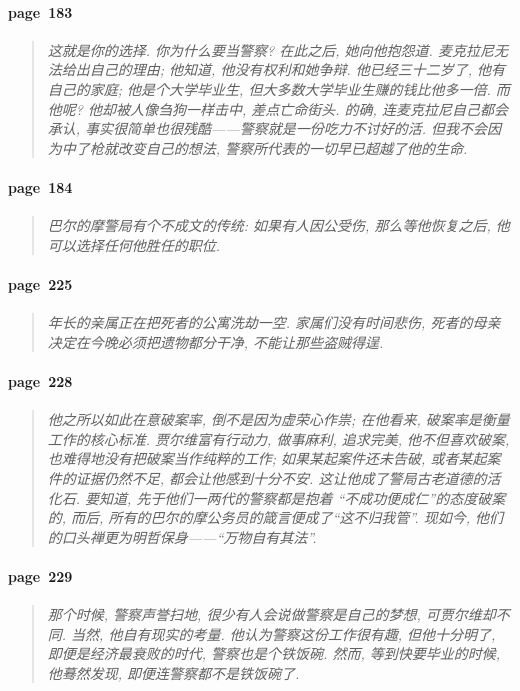\paragraph*{page~183}
\begin{quotation}
    \itshape
    这就是你的选择. 你为什么要当警察? 在此之后, 她向他抱怨道. 麦克拉尼无法给出自己的理由; 他知道, 他没有权利和她争辩. 他已经三十二岁了, 他有自己的家庭; 他是个大学毕业生, 但大多数大学毕业生赚的钱比他多一倍. 而他呢? 他却被人像刍狗一样击中, 差点亡命街头. 的确, 连麦克拉尼自己都会承认, 事实很简单也很残酷------警察就是一份吃力不讨好的活. 但我不会因为中了枪就改变自己的想法, 警察所代表的一切早已超越了他的生命.  
\end{quotation}

\paragraph*{page~184}
\begin{quotation}
    \itshape
    巴尔的摩警局有个不成文的传统: 如果有人因公受伤, 那么等他恢复之后, 他可以选择任何他胜任的职位. 
\end{quotation}

\paragraph*{page~225}
\begin{quotation}
    \itshape
    年长的亲属正在把死者的公寓洗劫一空. 家属们没有时间悲伤, 死者的母亲决定在今晚必须把遗物都分干净, 不能让那些盗贼得逞. 
\end{quotation}

\paragraph*{page~228}
\begin{quotation}
    \itshape
    他之所以如此在意破案率, 倒不是因为虚荣心作祟; 在他看来, 破案率是衡量工作的核心标准. 贾尔维富有行动力, 做事麻利, 追求完美, 他不但喜欢破案, 也难得地没有把破案当作纯粹的工作; 如果某起案件还未告破, 或者某起案件的证据仍然不足, 都会让他感到十分不安. 这让他成了警局古老道德的活化石. 要知道, 先于他们一两代的警察都是抱着 ``不成功便成仁''的态度破案的, 而后, 所有的巴尔的摩公务员的箴言便成了``这不归我管''. 现如今, 他们的口头禅更为明哲保身------``万物自有其法''.
\end{quotation}

\paragraph*{page~229}
\begin{quotation}
    \itshape
    那个时候, 警察声誉扫地, 很少有人会说做警察是自己的梦想, 可贾尔维却不同. 当然, 他自有现实的考量. 他认为警察这份工作很有趣, 但他十分明了, 即便是经济最衰败的时代, 警察也是个铁饭碗. 然而, 等到快要毕业的时候, 他蓦然发现, 即便连警察都不是铁饭碗了. 
\end{quotation}

